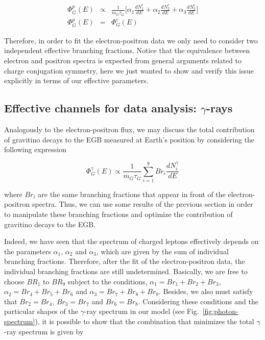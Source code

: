 \documentclass[a4paper,11pt]{article}
\begin{document}
\begin{eqnarray}
\Phi_{G}^{p}(E) & \propto & \frac{1}{m_{G}\tau_{G}}\biggl[\alpha_{1}\frac{dN^e_{1}}{dE}+\alpha_{2}\frac{dN^e_{2}}{dE}+\alpha_{3}\frac{dN^e_{3}}{dE}\biggr] \\
\Phi_{G}^{p}(E) &=& \Phi_{G}^{e}(E)
\label{ele-pos-spec}
\end{eqnarray}


Therefore, in order to fit the electron-positron data we only need to consider two independent effective branching fractions. Notice that the equivalence between electron and positron spectra is expected from general arguments related to charge conjugation symmetry, here we just wanted to show and verify this issue explicitly in terms of our effective parameters.

\subsection*{Effective channels for data analysis: $\gamma$-rays}

Analogously to the electron-positron flux, we may discuss the total contribution of gravitino decays to the EGB measured at Earth's position by considering the following expression

\begin{equation}
\Phi_{G}^{\gamma}(E) \propto\frac{1}{m_{G}\tau_{G}}\sum_{i=1}^{9}Br_{i}\frac{dN^{\gamma}_{i}}{dE}
\end{equation}

\noindent where $Br_i$ are the same branching fractions that appear in front of the electron-positron spectra. Thus, we can use some results of the previous section in order to manipulate these branching fractions and optimize the contribution of gravitino decays to the EGB. 

Indeed, we have seen that the spectrum of charged leptons effectively depends on the parameters $\alpha_1$, $\alpha_2$ and $\alpha_3$, which are given by the sum of individual branching fractions. Therefore, after the fit of the electron-positron data, the individual branching fractions are still undetermined. Basically, we are free to choose $BR_{1}$ to $BR_{9}$ subject to the conditions, $\alpha_{1}=Br_{1}+Br_{2}+Br_{3}$, $\alpha_{2}=Br_{4}+Br_{5}+Br_{6}$ and $\alpha_{3}=Br_{7}+Br_{8}+Br_{9}$. Besides, we also must satisfy that $Br_2 = Br_4$, $Br_3 = Br_7$ and $Br_6 = Br_8$. Considering these conditions and the particular shapes of the $\gamma$-ray spectrum in our model (see Fig.~\ref{fig:photon-spectrum}), it is possible to show that the combination that minimizes the total $\gamma$-ray spectrum is given by
\end{document}
